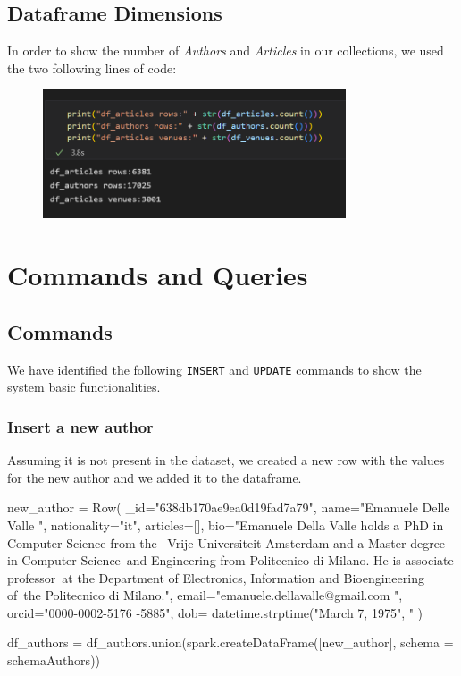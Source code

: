 \documentclass{Configuration_Files/PoliMi3i_thesis}
\begin{document}
\newpage
\section{Dataframe Dimensions}
In order to show the number of \emph{Authors} and \emph{Articles} in our collections, we used the two following lines
of code:
\begin{figure}[H]
\centering
\includegraphics[width=0.8\textwidth]{dataframe_rows.PNG}
\label{fig:dataframe_dim}
\end{figure}



\chapter{Commands and Queries}
\label{ch:ceq}
\section{Commands}
We have identified the following \verb |INSERT| and \verb |UPDATE| commands to show the system basic functionalities.

\subsection{Insert a new author}
\label{auth_insert}
Assuming it is not present in the dataset, we created a new row with the values for the new author and we added it to the
dataframe.\newline
\begin{python}
new_author = Row(
    _id="638db170ae9ea0d19fad7a79",
    name="Emanuele Delle Valle ",
    nationality="it",
    articles=[],
    bio="Emanuele Della Valle holds a PhD in Computer Science from the \
        Vrije Universiteit Amsterdam and a Master degree in Computer Science\
        and Engineering from Politecnico di Milano. He is associate professor\
        at the Department of Electronics, Information and Bioengineering of\
        the Politecnico di Milano.",
    email="emanuele.dellavalle@gmail.com ",
    orcid="0000-0002-5176 -5885",
    dob= datetime.strptime("March 7, 1975", "%
)

df_authors = df_authors.union(spark.createDataFrame([new_author], schema = schemaAuthors))
\end{python}
\end{document}
